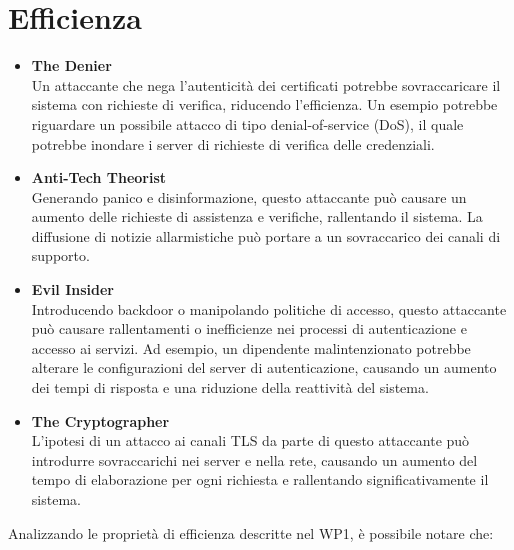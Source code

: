     \section{Efficienza}
        \begin{itemize}
            \item \textbf{The Denier} \\
                Un attaccante che nega l'autenticità dei certificati potrebbe sovraccaricare il sistema con richieste di verifica, riducendo l'efficienza.
                Un esempio potrebbe riguardare un possibile attacco di tipo denial-of-service (DoS), il quale potrebbe inondare i server di richieste di verifica delle credenziali.

            \item \textbf{Anti-Tech Theorist} \\
                Generando panico e disinformazione, questo attaccante può causare un aumento delle richieste di assistenza e verifiche, rallentando il sistema.
                La diffusione di notizie allarmistiche può portare a un sovraccarico dei canali di supporto.

            \item \textbf{Evil Insider} \\
                Introducendo backdoor o manipolando politiche di accesso, questo attaccante può causare rallentamenti o inefficienze nei processi di autenticazione e accesso ai servizi.
                Ad esempio, un dipendente malintenzionato potrebbe alterare le configurazioni del server di autenticazione, causando un aumento dei tempi di risposta e una riduzione della reattività del sistema.

            \item \textbf{The Cryptographer} \\
                L'ipotesi di un attacco ai canali TLS da parte di questo attaccante può introdurre sovraccarichi nei server e nella rete, causando un aumento del tempo di elaborazione per ogni richiesta e rallentando significativamente il sistema.
        \end{itemize}

        \noindent Analizzando le proprietà di efficienza descritte nel WP1, è possibile notare che:

